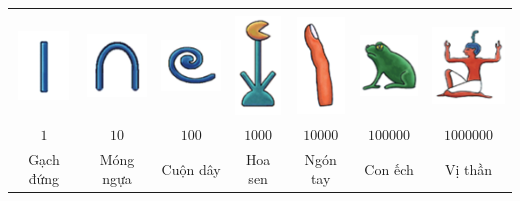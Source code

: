 	\begin{table}[H]
		\setlength{\tabcolsep}{5.05pt}
		\renewcommand{\arraystretch}{1.25}
		\centering
		\begin{tabular}{|c|c|c|c|c|c|c|}
			\hline
			& & & & & & \\[-3ex]
			\includegraphics[scale=1]{2a}&\includegraphics[scale=1]{2b}&\includegraphics[scale=1]{2c}&\includegraphics[scale=0.9]{2d}&\includegraphics[scale=1]{2e}&\includegraphics[scale=1]{2f}&\includegraphics[scale=1]{2g}\\
			\hline
			$1$&$10$ &$100$&$1000$&$10000$&$100000$&$1000000$\\
			\hline
			{Gạch đứng}&{Móng ngựa}&{Cuộn dây}&{Hoa sen}&{Ngón tay}&{Con ếch}&{Vị thần}\\
			\hline
		\end{tabular}
		\vspace*{-5pt}
	\end{table}

